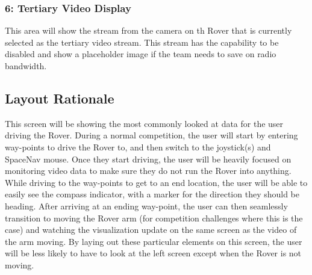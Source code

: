 \subsubsection{6: Tertiary Video Display}
This area will show the stream from the camera on th Rover that is currently selected as the tertiary video stream.
This stream has the capability to be disabled and show a placeholder image if the team needs to save on radio bandwidth.


\subsection{Layout Rationale}
This screen will be showing the most commonly looked at data for the user driving the Rover.
During a normal competition, the user will start by entering way-points to drive the Rover to, and then switch to the joystick(s) and SpaceNav mouse.
Once they start driving, the user will be heavily focused on monitoring video data to make sure they do not run the Rover into anything. 
While driving to the way-points to get to an end location, the user will be able to easily see the compass indicator, with a marker for the direction they should be heading.
After arriving at an ending way-point, the user can then seamlessly transition to moving the Rover arm (for competition challenges where this is the case) and watching the visualization update on the same screen as the video of the arm moving.
By laying out these particular elements on this screen, the user will be less likely to have to look at the left screen except when the Rover is not moving.